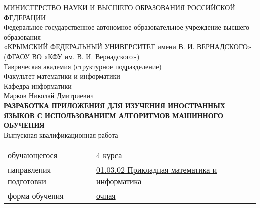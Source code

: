 \begin{center}
\small
МИНИСТЕРСТВО НАУКИ И ВЫСШЕГО ОБРАЗОВАНИЯ РОССИЙСКОЙ ФЕДЕРАЦИИ\\
{\normalsize Федеральное государственное автономное образовательное учреждение высшего образования}\\
«КРЫМСКИЙ ФЕДЕРАЛЬНЫЙ УНИВЕРСИТЕТ имени В. И. ВЕРНАДСКОГО»\\
(ФГАОУ ВО «КФУ им. В. И. Вернадского»)\\
\normalsize
Таврическая академия (структурное подразделение)\\
Факультет математики и информатики\\
Кафедра информатики\\
\vspace*{2\baselineskip}
Марков Николай Дмитриевич\\
\vspace*{1\baselineskip}
\textbf{РАЗРАБОТКА ПРИЛОЖЕНИЯ ДЛЯ ИЗУЧЕНИЯ ИНОСТРАННЫХ ЯЗЫКОВ С ИСПОЛЬЗОВАНИЕМ АЛГОРИТМОВ МАШИННОГО ОБУЧЕНИЯ}\\
\vspace*{2\baselineskip}
Выпускная квалификационная работа\\
\vspace*{1\baselineskip}
\end{center}

 
\begin{tabular}{m{12em} m{10em}}
	обучающегося & \underline{4 курса}\\
	направления подготовки &\underline{01.03.02 Прикладная математика и информатика}\\
	форма обучения &\underline{очная}\\
\end{tabular}\\

